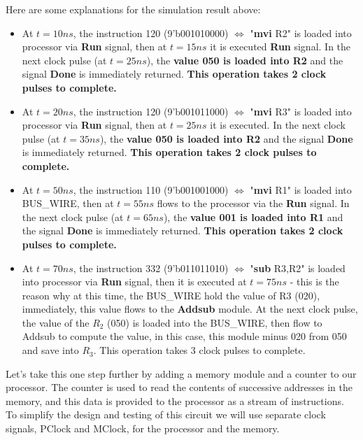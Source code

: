 Here are some explanations for the simulation result above:
\begin{itemize}
    \item At $t=10ns$, the instruction 120 (9'b001010000) $\iff$ "\textbf{mvi} R2" is loaded into processor via \textbf{Run} signal, then at $t=15ns$ it is executed \textbf{Run} signal. In the next clock pulse (at $t=25ns$), the \textbf{value 050 is loaded into R2} and the signal \textbf{Done} is immediately returned. \textbf{This operation takes 2 clock pulses to complete.}
    \item At $t=20ns$, the instruction 120 (9'b001011000) $\iff$ "\textbf{mvi} R3" is loaded into processor via \textbf{Run} signal, then at $t=25ns$ it is executed. In the next clock pulse (at $t=35ns$), the \textbf{value 050 is loaded into R2} and the signal \textbf{Done} is immediately returned. \textbf{This operation takes 2 clock pulses to complete.}
    \item At $t=50ns$, the instruction 110 (9'b001001000) $\iff$ "\textbf{mvi} R1" is loaded into BUS\_WIRE, then at $t=55ns$ flows to the processor via the \textbf{Run} signal. In the next clock pulse (at $t=65ns$), the \textbf{value 001 is loaded into R1} and the signal \textbf{Done} is immediately returned. \textbf{This operation takes 2 clock pulses to complete.}
    \item At $t=70ns$, the instruction 332 (9'b011011010) $\iff$ "\textbf{sub} R3,R2" is loaded into processor via \textbf{Run} signal, then it is executed at $t=75ns$ - this is the reason why at this time, the BUS\_WIRE hold the value of R3 (020), immediately, this value flows to the \textbf{Addsub} module. At the next clock pulse, the value of the $R_2$ (050) is loaded into the BUS\_WIRE, then flow to {Addsub} to compute the value, in this case, this module minus 020 from 050 and save into $R_3$. This operation takes 3 clock pulses to complete.
\end{itemize}
\clearpage
Let's take this one step further by adding a memory module and a counter to our processor. The counter is used to read the contents of successive addresses in the memory, and this data is provided to the processor as a stream of instructions. To simplify the design and testing of this circuit we will use separate clock signals, PClock and MClock, for the processor and the memory.

